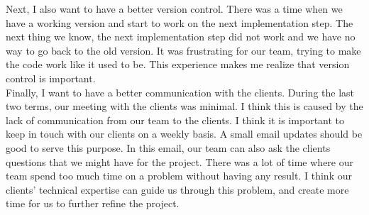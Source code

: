\begin{itemize}
				Next, I also want to have a better version control. There was a time when we have a working version and start to work on the next implementation step. The next thing we know, the next implementation step did not work and we have no way to go back to the old version. It was frustrating for our team, trying to make the code work like it used to be. This experience makes me realize that version control is important. \\
				
				Finally, I want to have a better communication with the clients. During the last two terms, our meeting with the clients was minimal. I think this is caused by the lack of communication from our team to the clients. I think it is important to keep in touch with our clients on a weekly basis. A small email updates should be good to serve this purpose. In this email, our team can also ask the clients questions that we might have for the project. There was a lot of time where our team spend too much time on a problem without having any result. I think our clients’ technical expertise can guide us through this problem, and create more time for us to further refine the project. \\
		\end{itemize}



